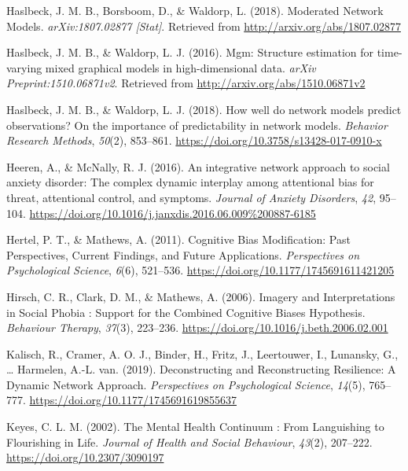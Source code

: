 \documentclass[
  english,
  man,floatsintext]{apa6}
\begin{document}
\leavevmode\hypertarget{ref-haslbeck_moderated_2018}{}%
Haslbeck, J. M. B., Borsboom, D., \& Waldorp, L. (2018). Moderated Network Models. \emph{arXiv:1807.02877 {[}Stat{]}}. Retrieved from \url{http://arxiv.org/abs/1807.02877}

\leavevmode\hypertarget{ref-R-mgm}{}%
Haslbeck, J. M. B., \& Waldorp, L. J. (2016). Mgm: Structure estimation for time-varying mixed graphical models in high-dimensional data. \emph{arXiv Preprint:1510.06871v2}. Retrieved from \url{http://arxiv.org/abs/1510.06871v2}

\leavevmode\hypertarget{ref-haslbeck_how_2018}{}%
Haslbeck, J. M. B., \& Waldorp, L. J. (2018). How well do network models predict observations? On the importance of predictability in network models. \emph{Behavior Research Methods}, \emph{50}(2), 853--861. \url{https://doi.org/10.3758/s13428-017-0910-x}

\leavevmode\hypertarget{ref-heeren_integrative_2016}{}%
Heeren, A., \& McNally, R. J. (2016). An integrative network approach to social anxiety disorder: The complex dynamic interplay among attentional bias for threat, attentional control, and symptoms. \emph{Journal of Anxiety Disorders}, \emph{42}, 95--104. \url{https://doi.org/10.1016/j.janxdis.2016.06.009\%200887-6185}

\leavevmode\hypertarget{ref-Hertel2011}{}%
Hertel, P. T., \& Mathews, A. (2011). Cognitive Bias Modification: Past Perspectives, Current Findings, and Future Applications. \emph{Perspectives on Psychological Science}, \emph{6}(6), 521--536. \url{https://doi.org/10.1177/1745691611421205}

\leavevmode\hypertarget{ref-Hirsch2006}{}%
Hirsch, C. R., Clark, D. M., \& Mathews, A. (2006). Imagery and Interpretations in Social Phobia : Support for the Combined Cognitive Biases Hypothesis. \emph{Behaviour Therapy}, \emph{37}(3), 223--236. \url{https://doi.org/10.1016/j.beth.2006.02.001}

\leavevmode\hypertarget{ref-kalisch_deconstructing_2019}{}%
Kalisch, R., Cramer, A. O. J., Binder, H., Fritz, J., Leertouwer, I., Lunansky, G., \ldots{} Harmelen, A.-L. van. (2019). Deconstructing and Reconstructing Resilience: A Dynamic Network Approach. \emph{Perspectives on Psychological Science}, \emph{14}(5), 765--777. \url{https://doi.org/10.1177/1745691619855637}

\leavevmode\hypertarget{ref-Keyes2002}{}%
Keyes, C. L. M. (2002). The Mental Health Continuum : From Languishing to Flourishing in Life. \emph{Journal of Health and Social Behaviour}, \emph{43}(2), 207--222. \url{https://doi.org/10.2307/3090197}
\end{document}
